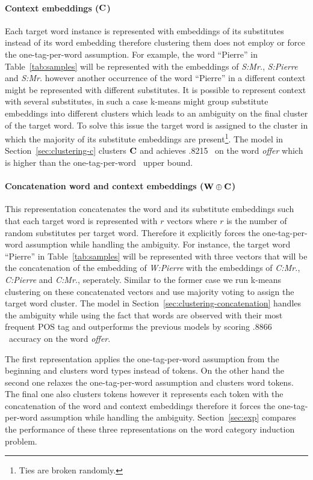 \paragraph{Context embeddings (${\bf C}$)} 
Each target word instance is represented with embeddings of its
substitutes instead of its word embedding therefore clustering them
does not employ or force the one-tag-per-word assumption.  For
example, the word ``Pierre'' in Table~\ref{tab:samples} will be
represented with the embeddings of {\it S:Mr.}, {\it S:Pierre} and
{\it S:Mr.}  however another occurrence of the word ``Pierre'' in a
different context might be represented with different substitutes.  It
is possible to represent context with several substitutes, in such a
case k-means might group substitute embeddings into different clusters
which leads to an ambiguity on the final cluster of the target word.
To solve this issue the target word is assigned to the cluster in
which the majority of its substitute embeddings are
present\footnote{Ties are broken randomly.}.  The model in
Section~\ref{sec:clustering-c} clusters ${\bf C}$ and achieves .8215
\mto\ on the word {\it offer} which is higher than the one-tag-per-word
\mto\ upper bound.

\paragraph{Concatenation word and context embeddings (${\bf W\oplus C}$)} 
This representation concatenates the word and its substitute
embeddings such that each target word is represented with $r$ vectors
where $r$ is the number of random substitutes per target word.
Therefore it explicitly forces the one-tag-per-word assumption while
handling the ambiguity.  For instance, the target word ``Pierre'' in
Table~\ref{tab:samples} will be represented with three vectors that
will be the concatenation of the embedding of {\it W:Pierre} with the
embeddings of {\it C:Mr.}, {\it C:Pierre} and {\it C:Mr.}, seperately.
Similar to the former case we run k-means clustering on these
concatenated vectors and use majority voting to assign the target word
cluster.  The model in Section~\ref{sec:clustering-concatenation}
handles the ambiguity while using the fact that words are observed
with their most frequent POS tag and outperforms the previous models
by scoring .8866 \mto\ accuracy on the word {\it offer}.

The first representation applies the one-tag-per-word assumption from
the beginning and clusters word types instead of tokens.  On the other
hand the second one relaxes the one-tag-per-word assumption and
clusters word tokens.  The final one also clusters tokens however it
represents each token with the concatenation of the word and context
embeddings therefore it forces the one-tag-per-word assumption while
handling the ambiguity.  Section~\ref{sec:exp} compares the
performance of these three representations on the word category
induction problem.
